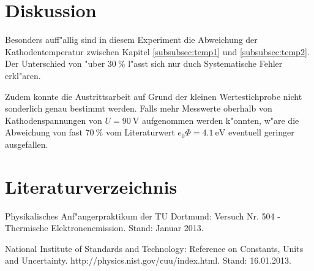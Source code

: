 \section{Diskussion}
	\label{diskussion}
	Besonders auff"allig sind in diesem Experiment die Abweichung der Kathodentemperatur zwischen Kapitel \ref{subsubsec:temp1} und \ref{subsubsec:temp2}.
	Der Unterschied von "uber $\SI{30}{\percent}$ l"asst sich nur duch Systematische Fehler erkl"aren.

	Zudem konnte die Austrittsarbeit auf Grund der kleinen Wertestichprobe nicht sonderlich genau bestimmt werden.
	Falls mehr Messwerte oberhalb von Kathodenspannungen von $U = \SI{90}{\volt}$ aufgenommen werden k"onnten, w"are die Abweichung von fast $\SI{70}{\percent}$ vom Literaturwert $e_0 \Phi = \SI{4.1}{\electronvolt}$ eventuell geringer ausgefallen.

\section{Literaturverzeichnis}
	\label{sec:literaturverzeichnis}

	\begin{thebibliography}{9}
		 Physikalisches Anf"angerpraktikum der TU Dortmund: Versuch Nr. 504 - Thermische Elektronenemission. Stand: Januar 2013.

		 National Institute of Standards and Technology: Reference on Constants, Units and Uncertainty. http://physics.nist.gov/cuu/index.html. Stand: 16.01.2013.
	\end{thebibliography}
